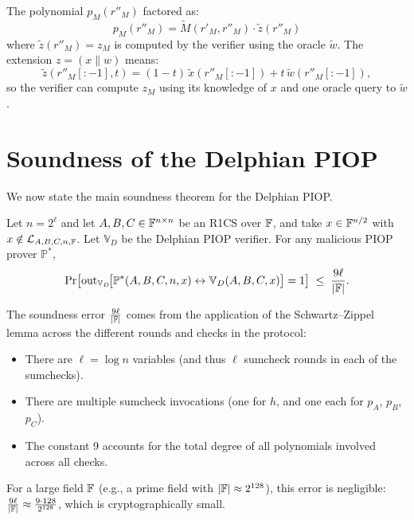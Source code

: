 \documentclass[11pt]{article}
\begin{document}
\begin{remark}[Structure of $p_M$]
  The polynomial $p_M(r''_M)$ factored as:
  \[
    p_M(r''_M) = \tilde{M}(r'_M, r''_M) \cdot \tilde{z}(r''_M)
  \]
  where $\tilde{z}(r''_M) = z_M$ is computed by the verifier using
  the oracle $\tilde{w}$. The extension $z = (x \| w)$ means:
  \[
    \tilde{z}(r''_M[:-1], t) =
      (1 - t)\,\tilde{x}(r''_M[:-1]) + t\,\tilde{w}(r''_M[:-1]),
  \]
  so the verifier can compute $z_M$ using its knowledge of $x$ and one oracle
  query to $\tilde{w}$.
\end{remark}

\section{Soundness of the Delphian PIOP}

We now state the main soundness theorem for the Delphian PIOP.

\begin{thmbox}
\begin{theorem}
  Let $n = 2^\ell$ and let $A, B, C \in \mathbb{F}^{n \times n}$ be an R1CS over $\mathbb{F}$,
  and take $x \in \mathbb{F}^{n/2}$ with $x \notin \mathcal{L}_{A,B,C,n,\mathbb{F}}$.
  Let $\mathbb{V}_D$ be the Delphian PIOP verifier. For any malicious PIOP
  prover $\mathbb{P}^*$,
  \[
    \Pr\!\left[\text{out}_{\mathbb{V}_D}\!\bigl[
      \mathbb{P}^*(A, B, C, n, x) \leftrightarrow \mathbb{V}_D(A, B, C, x)
    \bigr] = 1\right] \;\leq\; \frac{9\ell}{|\mathbb{F}|}.
  \]
\end{theorem}
\end{thmbox}

\begin{remark}
  The soundness error $\frac{9\ell}{|\mathbb{F}|}$ comes from the application of the
  Schwartz--Zippel lemma across the different rounds and checks in the protocol:
  \begin{itemize}
    \item There are $\ell = \log n$ variables (and thus $\ell$ sumcheck rounds
      in each of the sumchecks).
    \item There are multiple sumcheck invocations (one for $h$, and one each
      for $p_A$, $p_B$, $p_C$).
    \item The constant 9 accounts for the total degree of all polynomials
      involved across all checks.
  \end{itemize}
  For a large field $\mathbb{F}$ (e.g., a prime field with $|\mathbb{F}| \approx 2^{128}$), this
  error is negligible: $\frac{9\ell}{|\mathbb{F}|} \approx \frac{9 \cdot 128}{2^{128}}$,
  which is cryptographically small.
\end{remark}
\end{document}
